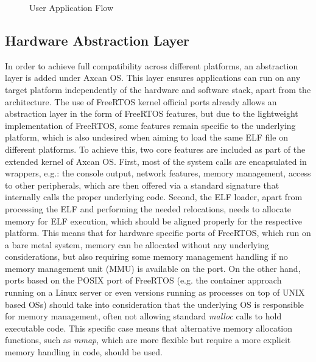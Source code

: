 \begin{figure}
	\centering
	
	\caption{User Application Flow}
	\label{fig:user_app_design}
\end{figure}

\subsection{Hardware Abstraction Layer}
In order to achieve full compatibility across different platforms, an abstraction layer is added under Axcan OS. This layer ensures applications can run on any target platform independently of the hardware and software stack, apart from the architecture. The use of FreeRTOS kernel official ports already allows an abstraction layer in the form of FreeRTOS features, but due to the lightweight implementation of FreeRTOS, some features remain specific to the underlying platform, which is also undesired when aiming to load the same ELF file on different platforms. To achieve this, two core features are included as part of the extended kernel of Axcan OS. First, most of the system calls are encapsulated in wrappers, e.g.: the console output, network features, memory management, access to other peripherals, which are then offered via a standard signature that internally calls the proper underlying code. Second, the ELF loader, apart from processing the ELF and performing the needed relocations, needs to allocate memory for ELF execution, which should be aligned properly for the respective platform. This means that for hardware specific ports of FreeRTOS, which run on a bare metal system, memory can be allocated without any underlying considerations, but also requiring some memory management handling if no memory management unit (MMU) is available on the port. On the other hand, ports based on the POSIX port of FreeRTOS (e.g. the container approach running on a Linux server or even versions running as processes on top of UNIX based OSs) should take into consideration that the underlying OS is responsible for memory management, often not allowing standard \textit{malloc} calls to hold executable code. This specific case means that alternative memory allocation functions, such as \textit{mmap}, which are more flexible but require a more explicit memory handling in code, should be used. 


